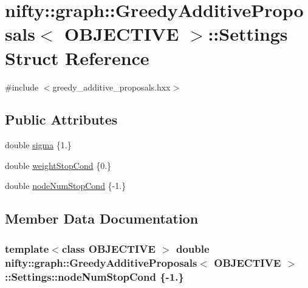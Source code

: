 \hypertarget{structnifty_1_1graph_1_1GreedyAdditiveProposals_1_1Settings}{}\section{nifty\+:\+:graph\+:\+:Greedy\+Additive\+Proposals$<$ O\+B\+J\+E\+C\+T\+I\+V\+E $>$\+:\+:Settings Struct Reference}
\label{structnifty_1_1graph_1_1GreedyAdditiveProposals_1_1Settings}


{\ttfamily \#include $<$greedy\+\_\+additive\+\_\+proposals.\+hxx$>$}

\subsection*{Public Attributes}
\begin{DoxyCompactItemize}
\item 
double \hyperlink{structnifty_1_1graph_1_1GreedyAdditiveProposals_1_1Settings_a469ca037db03bbe6d6d1e6234e1d6e2f}{sigma} \{1.\}
\item 
double \hyperlink{structnifty_1_1graph_1_1GreedyAdditiveProposals_1_1Settings_a0d0986525d84eb607bd46ff4fe44fbee}{weight\+Stop\+Cond} \{0.\}
\item 
double \hyperlink{structnifty_1_1graph_1_1GreedyAdditiveProposals_1_1Settings_aae1c7f41833e3f31c30bfcb276a6891c}{node\+Num\+Stop\+Cond} \{-\/1.\}
\end{DoxyCompactItemize}


\subsection{Member Data Documentation}
\hypertarget{structnifty_1_1graph_1_1GreedyAdditiveProposals_1_1Settings_aae1c7f41833e3f31c30bfcb276a6891c}{}
\subsubsection[{node\+Num\+Stop\+Cond}]{\setlength{\rightskip}{0pt plus 5cm}template$<$class O\+B\+J\+E\+C\+T\+I\+V\+E $>$ double {\bf nifty\+::graph\+::\+Greedy\+Additive\+Proposals}$<$ O\+B\+J\+E\+C\+T\+I\+V\+E $>$\+::Settings\+::node\+Num\+Stop\+Cond \{-\/1.\}}\label{structnifty_1_1graph_1_1GreedyAdditiveProposals_1_1Settings_aae1c7f41833e3f31c30bfcb276a6891c}
\hypertarget{structnifty_1_1graph_1_1GreedyAdditiveProposals_1_1Settings_a469ca037db03bbe6d6d1e6234e1d6e2f}{}
